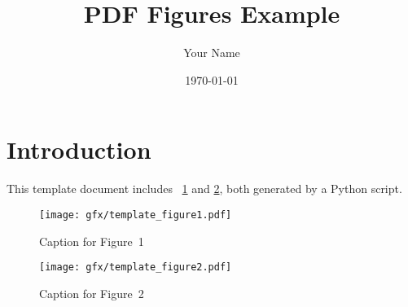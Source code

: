 \documentclass{article}
\begin{document}
\title{PDF Figures Example}
\author{Your Name}
\date{\today}
\maketitle

\section{Introduction}
This template document includes \figurename~\ref{fig:figure1} and \ref{fig:figure2}, both generated by a Python script.

\begin{figure}[h]
    \centering
    \texttt{[image: gfx/template\_figure1.pdf]}
    \caption{Caption for Figure~1}
    \label{fig:figure1}
\end{figure}

\begin{figure}[h]
    \centering
    \texttt{[image: gfx/template\_figure2.pdf]}
    \caption{Caption for Figure~2}
    \label{fig:figure2}
\end{figure}
\end{document}
